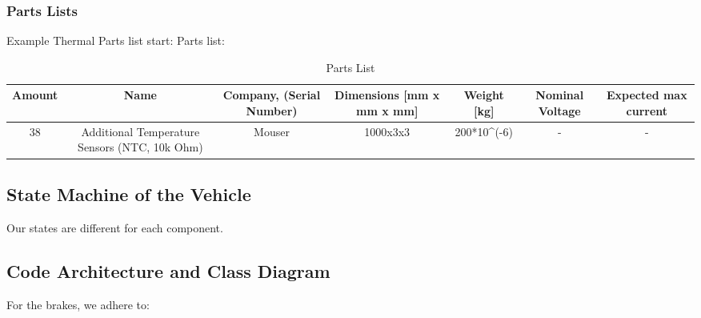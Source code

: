 \subsubsection{Parts Lists}
Example Thermal Parts list start:
Parts list:
\begin{table}[h]
    \centering
    \caption{Parts List}
        \begin{adjustbox}{width=\textwidth,center}
    \begin{tabular}{|c|c|c|c|c|c|c|}
        \hline
        \textbf{Amount} & \textbf{Name} & \textbf{Company, (Serial Number)} & \textbf{Dimensions [mm x mm x mm]} & \textbf{Weight [kg]} & \textbf{Nominal Voltage} & \textbf{Expected max current} \\
        \hline
        38& Additional Temperature Sensors (NTC, 10k Ohm) & Mouser & 1000x3x3& 200*10^(-6)& - & - \\
    \end{tabular}
        \end{adjustbox}
\end{table}


\subsection{State Machine of the Vehicle}

Our states are different for each component.

\subsection{Code Architecture and Class Diagram}
For the brakes, we adhere to: \\

